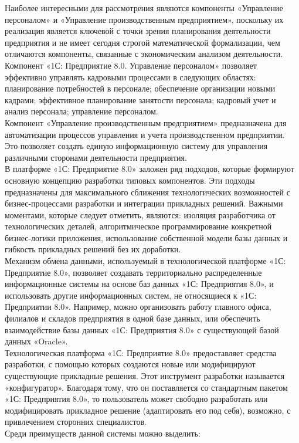 \indent Наиболее интересными для рассмотрения являются компоненты «Управление персоналом» и «Управление производственным предприятием», поскольку их реализация является ключевой с точки зрения планирования деятельности предприятия и не имеет сегодня строгой математической формализации, чем отличаются компоненты, связанные с экономическим анализом деятельности.\\
\indent Компонент «1С: Предприятие 8.0. Управление персоналом» позволяет эффективно управлять кадровыми процессами в следующих областях: планирование потребностей в персонале; обеспечение организации новыми кадрами; эффективное планирование занятости персонала; кадровый учет и анализ персонала; управление персоналом.\\
\indent Компонент «Управление производственным предприятием» предназначена для автоматизации процессов управления и учета производственном предприятии.
Это позволяет создать единую информационную систему для управления различными сторонами деятельности предприятия.\\
\indent В платформе «1С: Предприятие 8.0» заложен ряд подходов, которые формируют основную концепцию разработки типовых компонентов. 
Эти подходы предназначены для максимального сближения технологических возможностей с бизнес-процессами разработки и интеграции прикладных решений.
Важными моментами, которые следует отметить, являются: изоляция разработчика от технологических деталей, алгоритмическое программирование конкретной бизнес-логики приложения, использование собственной модели базы данных и гибкость прикладных решений без их доработки.\\
\indent Механизм обмена данными, используемый в технологической платформе «1С: Предприятие 8.0», позволяет создавать территориально распределенные информационные системы на основе баз данных «1С: Предприятия 8.0», и использовать другие информационных систем, не относящиеся к «1С: Предприятии 8.0».
Например, можно организовать работу главного офиса, филиалов и складов предприятия в одной базе данных, или обеспечить взаимодействие базы данных «1С: Предприятия 8.0» с существующей базой данных «Oracle».\\
\indent Технологическая платформа «1С: Предприятие 8.0» предоставляет средства разработки, с помощью которых создаются новые или модифицируют существующие прикладные решения.
Этот инструмент разработки называется «конфигуратор».
Благодаря тому, что он поставляется со стандартным пакетом «1С: Предприятия 8.0», то пользователь может свободно разработать или модифицировать прикладное решение (адаптировать его под себя), возможно, с привлечением сторонних специалистов.\\
\indent Среди преимуществ данной системы можно выделить:

